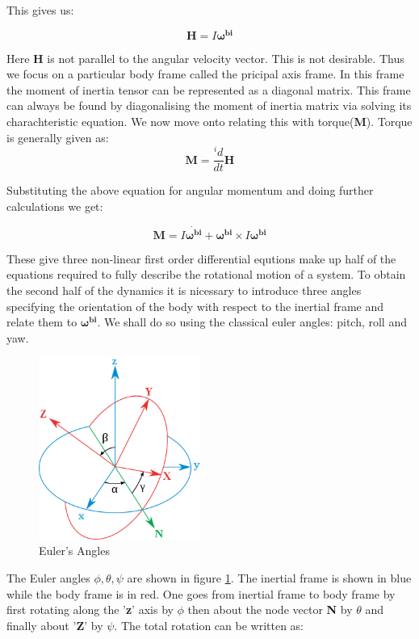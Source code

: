 \documentclass[12pt, letterpaper]{article}
\begin{document}
This gives us:

\begin{displaymath}
\mathbf{H} = I \mathbf{\omega^{bi}}
\end{displaymath}

Here \textbf{H} is not parallel to the angular velocity vector. This is not desirable. Thus we focus on a particular body frame called the pricipal axis frame. In this frame the moment of inertia tensor can be represented as a diagonal matrix. This frame can always be found by diagonalising the moment of inertia matrix via solving its charachteristic equation. We now move onto relating this with torque(\textbf{M}). Torque is generally given as:
\begin{displaymath}
\mathbf{M} = \frac{{}^id}{dt}\mathbf{H}
\end{displaymath}

Substituting the above equation for angular momentum and doing further calculations we get:

\begin{displaymath}
\mathbf{M} = I\dot{\mathbf{\omega^{bi}}} + \mathbf{\omega^{bi}}\times I \mathbf{\omega^{bi}}
\end{displaymath}

These give three non-linear first order differential equtions make up half of the equations required to fully describe the rotational motion of a system. To obtain the second half of the dynamics it is nicessary to introduce three angles specifying the orientation of the body with respect to the inertial frame and relate them to $\mathbf{\omega^{bi}}$. We shall do so using the classical euler angles: pitch, roll and yaw.

\begin{figure}[h]
	\centering
    \includegraphics[width = 200px]{EulerAngles}
    \caption{Euler's Angles}
	\label{fig:euler}
\end{figure}

The Euler angles $\phi,\theta,\psi$ are shown in figure \ref{fig:euler}. The inertial frame is shown in blue while the body frame is in red. One goes from inertial frame to body frame by first rotating along the '\textbf{z}' axis by $\phi$ then about the node vector \textbf{N} by $\theta$ and finally about '\textbf{Z}' by $\psi$. The total rotation can be written as:
\end{document}
